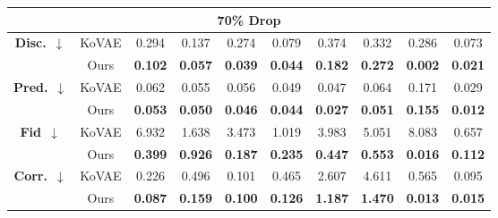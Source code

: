 \documentclass{article}
\theoremstyle{plain}
\theoremstyle{definition}
\theoremstyle{remark}
\begin{document}
\begin{table}[!t]
{\begin{tabular}{cc|cccccccc}
    \multicolumn{10}{c}{\textbf{70\% Drop}} \\
    \midrule
    \multirow{2}{*}{\textbf{Disc.}~$\downarrow$}
      & KoVAE  & 0.294 & 0.137 & 0.274 & 0.079 & 0.374 & 0.332 & 0.286 & 0.073 \\
      & Ours   & \cellcolor{blue!10}\textbf{0.102}
               & \cellcolor{blue!10}\textbf{0.057}
               & \cellcolor{blue!10}\textbf{0.039}
               & \cellcolor{blue!10}\textbf{0.044}
               & \cellcolor{blue!10}\textbf{0.182}
               & \cellcolor{blue!10}\textbf{0.272}
               & \cellcolor{blue!10}\textbf{0.002}
               & \cellcolor{blue!10}\textbf{0.021} \\
    \midrule
    \multirow{2}{*}{\textbf{Pred.}~$\downarrow$} 
      & KoVAE  & 0.062 & 0.055 & 0.056 & 0.049 & 0.047 & 0.064 & 0.171 & 0.029 \\
      & Ours   & \cellcolor{blue!10}\textbf{0.053}
               & \cellcolor{blue!10}\textbf{0.050}
               & \cellcolor{blue!10}\textbf{0.046}
               & \cellcolor{blue!10}\textbf{0.044}
               & \cellcolor{blue!10}\textbf{0.027}
               & \cellcolor{blue!10}\textbf{0.051}
               & \cellcolor{blue!10}\textbf{0.155}
               & \cellcolor{blue!10}\textbf{0.012} \\
    \midrule
    \multirow{2}{*}{\textbf{Fid}~$\downarrow$}     
      & KoVAE  & 6.932 & 1.638 & 3.473 & 1.019 & 3.983 & 5.051 & 8.083 & 0.657 \\
      & Ours   & \cellcolor{blue!10}\textbf{0.399}
               & \cellcolor{blue!10}\textbf{0.926}
               & \cellcolor{blue!10}\textbf{0.187}
               & \cellcolor{blue!10}\textbf{0.235}
               & \cellcolor{blue!10}\textbf{0.447}
               & \cellcolor{blue!10}\textbf{0.553}
               & \cellcolor{blue!10}\textbf{0.016}
               & \cellcolor{blue!10}\textbf{0.112} \\
    \midrule
    \multirow{2}{*}{\textbf{Corr.}~$\downarrow$}     
      & KoVAE  & 0.226 & 0.496 & 0.101 & 0.465 & 2.607 & 4.611 & 0.565 & 0.095 \\
      & Ours   & \cellcolor{blue!10}\textbf{0.087}
               & \cellcolor{blue!10}\textbf{0.159}
               & \cellcolor{blue!10}\textbf{0.100}
               & \cellcolor{blue!10}\textbf{0.126}
               & \cellcolor{blue!10}\textbf{1.187}
               & \cellcolor{blue!10}\textbf{1.470}
               & \cellcolor{blue!10}\textbf{0.013}
               & \cellcolor{blue!10}\textbf{0.015} \\
    \bottomrule
\end{tabular}
}
\end{table}
\end{document}
